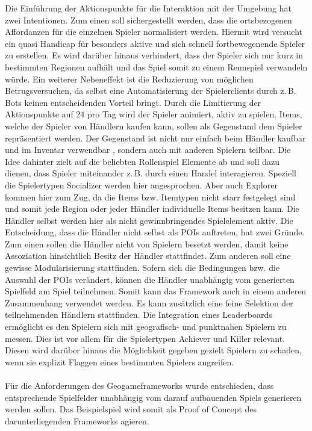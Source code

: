 Die Einführung der Aktionspunkte für die Interaktion mit der Umgebung hat zwei Intentionen. Zum einen soll sichergestellt werden, dass die ortsbezogenen Affordanzen für die einzelnen Spieler normalisiert werden. Hiermit wird versucht ein quasi Handicap für besonders aktive und sich schnell fortbewegenende Spieler zu erstellen. Es wird darüber hinaus verhindert, dass der Spieler sich nur kurz in bestimmten Regionen aufhält und das Spiel somit zu einem Rennspiel verwandeln würde.\cite{Schlieder.2005} Ein weiterer Nebeneffekt ist die Reduzierung von möglichen Betrugsversuchen, da selbst eine Automatisierung der Spielerclients durch z.\,B. Bots keinen entscheidenden Vorteil bringt.\cite{Golle.2005} Durch die Limitierung der Aktionspunkte auf 24 pro Tag wird der Spieler animiert, aktiv zu spielen. Items, welche der Spieler von Händlern kaufen kann, sollen als Gegenstand dem Spieler repräsentiert werden. Der Gegenstand ist nicht nur einfach beim Händler kaufbar und im Inventar verwendbar , sondern auch mit anderen Spielern teilbar. Die Idee dahinter zielt auf die beliebten Rollenspiel Elemente ab und soll dazu dienen, dass Spieler miteinander z.\,B. durch einen Handel interagieren. Speziell die Spielertypen Socializer werden hier angesprochen. Aber auch Explorer kommen hier zum Zug, da die Items bzw. Itemtypen nicht starr festgelegt sind und somit jede Region oder jeder Händler individuelle Items besitzen kann. Die Händler selbst werden hier als nicht gewinnbringendes Spielelement aktiv. Die Entscheidung, dass die Händler nicht selbst als POIs auftreten, hat zwei Gründe. Zum einen sollen die Händler nicht von Spielern \glqq besetzt\grqq{} werden, damit keine Assoziation hinsichtlich \glqq Besitz\grqq{} der Händler stattfindet. Zum anderen soll eine gewisse Modularisierung stattfinden. Sofern sich die Bedingungen bzw. die Auswahl der POIs verändert, können die Händler unabhängig vom generierten Spielfeld am Spiel teilnehmen. Somit kann das Framework auch in einem anderen Zusammenhang verwendet werden. Es kann zusätzlich eine feine Selektion der teilnehmenden Händlern stattfinden.
Die Integration eines Leaderboards ermöglicht es den Spielern sich mit geografisch- und punktnahen Spielern zu messen. Dies ist vor allem für die Spielertypen Achiever und Killer relevant. Diesen wird darüber hinaus die Möglichkeit gegeben gezielt Spielern zu schaden, wenn sie explizit Flaggen eines bestimmten Spielers angreifen.
\\\\
Für die Anforderungen des Geogameframeworks wurde entschieden, dass  entsprechende Spielfelder unabhängig vom darauf aufbauenden Spiels generieren werden sollen. Das Beispielspiel wird somit als Proof of Concept des darunterliegenden Frameworks agieren.
